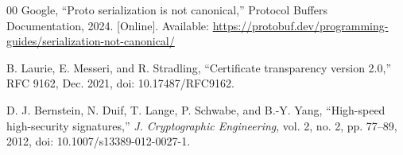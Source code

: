 \documentclass[conference,a4paper]{IEEEtran}
\begin{document}
\begin{thebibliography}{00}
Google, ``Proto serialization is not canonical,'' Protocol Buffers Documentation, 2024. [Online].
Available: \url{https://protobuf.dev/programming-guides/serialization-not-canonical/}

B. Laurie, E. Messeri, and R. Stradling, ``Certificate transparency version 2.0,'' RFC 9162, Dec.
2021, doi: 10.17487/RFC9162.

D. J. Bernstein, N. Duif, T. Lange, P. Schwabe, and B.-Y. Yang, ``High-speed high-security
signatures,'' \emph{J. Cryptographic Engineering}, vol. 2, no. 2, pp. 77--89, 2012,
doi: 10.1007/s13389-012-0027-1.

\end{thebibliography}
\end{document}
